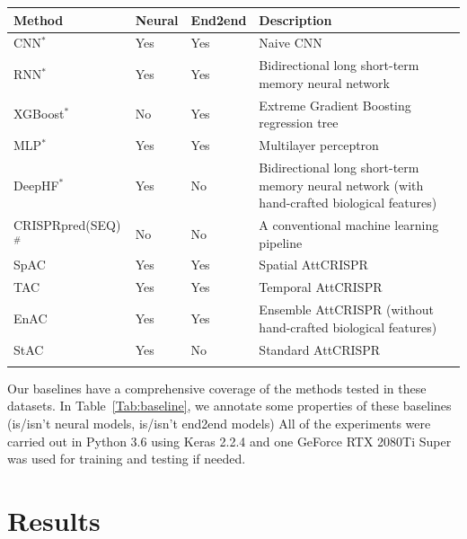 \documentclass{bioinfo}
\begin{document}
\begin{table}[!tpb]
    {\begin{tabular}{@{}lllp{3.5cm}l@{}}\toprule
        Method & Neural & End2end & Description\\\midrule
        CNN$^*$ & Yes & Yes & Naive CNN\\
        RNN$^*$ & Yes & Yes & Bidirectional long short-term memory neural network\\
        XGBoost$^*$ & No & Yes & Extreme Gradient Boosting regression tree\\
        MLP$^*$ & Yes & Yes & Multilayer perceptron\\
        DeepHF$^*$ & Yes & No & Bidirectional long short-term memory neural network (with hand-crafted biological features)\\
        CRISPRpred(SEQ)$^{\#}$ & No & No & A conventional machine learning pipeline\\
        SpAC & Yes & Yes & Spatial AttCRISPR\\
        TAC & Yes & Yes & Temporal AttCRISPR\\
        EnAC & Yes & Yes & Ensemble AttCRISPR (without hand-crafted biological features)\\
        StAC & Yes & No & Standard AttCRISPR\\
        \botrule
    \end{tabular}}\footnotesize{}
\end{table}

Our baselines have a comprehensive coverage of the methods tested in these datasets. 
In Table~\ref{Tab:baseline}, we annotate some properties of these baselines (is/isn't neural models, is/isn't end2end models)
All of the experiments were carried out in Python 3.6 using Keras 2.2.4 and one GeForce RTX 2080Ti Super was used for training and testing if needed. 

\section{Results}
\end{document}
